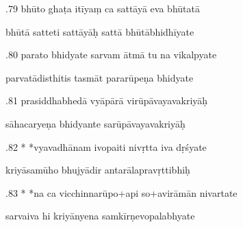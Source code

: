 \documentclass[article,12pt,a4paper]{memoir}%
\newcounter{parCount}
\begin{document}
	  
	  \pstart {}.79 bhūto ghaṭa itīyaṃ ca sattāyā eva bhūtatā 
	{}
	\pend%
      

	  
	  \pstart \leavevmode%
	bhūtā satteti sattāyāḥ sattā bhūtābhidhīyate 
	{}
	\pend%
      

	  
	  \pstart {}.80 parato bhidyate sarvam ātmā tu na vikalpyate 
	{}
	\pend%
      

	  
	  \pstart \leavevmode%
	parvatādisthitis tasmāt pararūpeṇa bhidyate 
	{}
	\pend%
      

	  
	  \pstart {}.81 prasiddhabhedā vyāpārā virūpāvayavakriyāḥ 
	{}
	\pend%
      

	  
	  \pstart \leavevmode%
	sāhacaryeṇa bhidyante sarūpāvayavakriyāḥ 
	{}
	\pend%
      

	  
	  \pstart {}.82 * *vyavadhānam ivopaiti nivṛtta iva dṛśyate 
	{}
	\pend%
      

	  
	  \pstart \leavevmode%
	kriyāsamūho bhujyādir antarālapravṛttibhiḥ 
	{}
	\pend%
      

	  
	  \pstart {}.83 * *na ca vicchinnarūpo+api so+avirāmān nivartate 
	{}
	\pend%
      

	  
	  \pstart \leavevmode%
	sarvaiva hi kriyānyena samkīrṇevopalabhyate 
	{}
	\pend%
      
\end{document}
